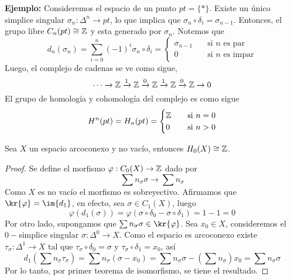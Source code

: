 \documentclass{article}
\begin{document}
\vspace{2mm}
\noindent\textbf{Ejemplo: } Consideremos el espacio de un punto $pt=\{*\}$. Existe un único 
simplice singular $\sigma_{n}:\Delta^{n}\to pt$, lo que implica que $\sigma_{n}\circ\delta_{i}
=\sigma_{n-1}$. Entonces, el grupo libre $C_{n}(pt)\cong\mathbb{Z}$ y esta generado por $\sigma_{n}$.
Notemos que
\begin{equation*}
    d_{n}(\sigma_{n})=\sum_{i=0}^{n}(-1)^{i}\sigma_{n}\circ\delta_{i}=\begin{cases}
        \sigma_{n-1} &\quad\text{si }n\text{ es par} \\
        0 &\quad\text{si }n\text{ es impar}
    \end{cases}
\end{equation*}
Luego, el complejo de cadenas se ve como sigue,
\begin{equation*}
    \cdots\xrightarrow[]{}\mathbb{Z}\xrightarrow[]{1}\mathbb{Z}\xrightarrow[]{0}\mathbb{Z}\xrightarrow[]{1}\mathbb{Z}
    \xrightarrow[]{0}\mathbb{Z}\xrightarrow[]{}0
\end{equation*}
El grupo de homología y cohomología del complejo es como sigue
\begin{equation*}
    H^{n}(pt)=H_{n}(pt)=\begin{cases}
        \mathbb{Z} & \quad\text{si }n=0 \\
        0 & \quad\text{si }n>0
    \end{cases}
\end{equation*}

\vspace{2mm}
\begin{lema}
    Sea $X$ un espacio arcoconexo y no vacío, entonces $H_{0}(X)\cong\mathbb{Z}$.
\end{lema}
\begin{proof}
    Se define el morfismo $\varphi: C_{0}(X)\to\mathbb{Z}$ dado por
    \begin{equation*}
        \sum n_{\sigma}\sigma\to\sum n_{\sigma}
    \end{equation*}
    Como $X$ es no vacío el morfismo es sobreyectivo. Afirmamos que $\kr{\varphi}=\im{d_{1}}$, en
    efecto, sea $\sigma\in C_{1}(X)$, luego
    \begin{equation*}
        \varphi(d_{1}(\sigma))=\varphi(\sigma\circ\delta_{0}-\sigma\circ\delta_{1})=1-1=0
    \end{equation*}
    Por otro lado, supongamos que $\sum n_{\sigma}\sigma\in\kr{\varphi}$. Sea $x_{0}\in X$, 
    consideremos el $0-$simplice singular $\sigma:\Delta^{0}\to X$. Como el espacio es arcoconexo
    existe $\tau_{\sigma}:\Delta^{1}\to X$ tal que $\tau_{\sigma}\circ\delta_{0}=\sigma$ y 
    $\tau_{\sigma}\circ\delta_{1}=x_{0}$, así
    \begin{equation*}
        d_{1}\left(\sum n_{\sigma}\tau_{\sigma}\right)=\sum n_{\sigma}(\sigma-x_{0})
        =\sum n_{\sigma}\sigma-\left(\sum n_{\sigma}\right)x_{0}=\sum n_{\sigma}\sigma
    \end{equation*}
    Por lo tanto, por primer teorema de isomorfismo, se tiene el resultado.
\end{proof}

\end{document}
